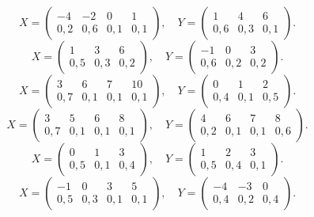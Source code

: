 $$ X = \left(\begin{array}{*{4}{c}} -4 & -2 & 0 & 1 \\ 0{,}2 & 0{,}6 & 0{,}1 & 0{,}1 \end{array}\right), \quad Y = \left(\begin{array}{*{3}{c}} 1 & 4 & 6 \\ 0{,}6 & 0{,}3 & 0{,}1 \end{array}\right). $$
$$ X = \left(\begin{array}{*{3}{c}} 1 & 3 & 6 \\ 0{,}5 & 0{,}3 & 0{,}2 \end{array}\right), \quad Y = \left(\begin{array}{*{3}{c}} -1 & 0 & 3 \\ 0{,}6 & 0{,}2 & 0{,}2 \end{array}\right). $$
$$ X = \left(\begin{array}{*{4}{c}} 3 & 6 & 7 & 10 \\ 0{,}7 & 0{,}1 & 0{,}1 & 0{,}1 \end{array}\right), \quad Y = \left(\begin{array}{*{3}{c}} 0 & 1 & 2 \\ 0{,}4 & 0{,}1 & 0{,}5 \end{array}\right). $$
$$ X = \left(\begin{array}{*{4}{c}} 3 & 5 & 6 & 8 \\ 0{,}7 & 0{,}1 & 0{,}1 & 0{,}1 \end{array}\right), \quad Y = \left(\begin{array}{*{4}{c}} 4 & 6 & 7 & 8 \\ 0{,}2 & 0{,}1 & 0{,}1 & 0{,}6 \end{array}\right). $$
$$ X = \left(\begin{array}{*{3}{c}} 0 & 1 & 3 \\ 0{,}5 & 0{,}1 & 0{,}4 \end{array}\right), \quad Y = \left(\begin{array}{*{3}{c}} 1 & 2 & 3 \\ 0{,}5 & 0{,}4 & 0{,}1 \end{array}\right). $$
$$ X = \left(\begin{array}{*{4}{c}} -1 & 0 & 3 & 5 \\ 0{,}5 & 0{,}3 & 0{,}1 & 0{,}1 \end{array}\right), \quad Y = \left(\begin{array}{*{3}{c}} -4 & -3 & 0 \\ 0{,}4 & 0{,}2 & 0{,}4 \end{array}\right). $$
